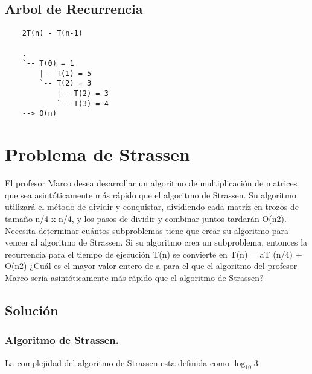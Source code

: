 \documentclass[12pt]{exam}
\begin{document}
\subsection*{Arbol de Recurrencia}
\begin{verbatim}
    2T(n) - T(n-1)

    .
    `-- T(0) = 1
        |-- T(1) = 5
        `-- T(2) = 3
            |-- T(2) = 3 
            `-- T(3) = 4
    --> O(n)
\end{verbatim}

\section*{Problema de Strassen}

El profesor Marco desea desarrollar un algoritmo de multiplicación de matrices
que sea asintóticamente más rápido que el algoritmo de Strassen. Su algoritmo utilizará el
método de dividir y conquistar, dividiendo cada matriz en trozos de tamaño n/4 x n/4, y los
pasos de dividir y combinar juntos tardarán O(n2). Necesita determinar cuántos subproblemas
tiene que crear su algoritmo para vencer al algoritmo de Strassen. Si su algoritmo crea
un subproblema, entonces la recurrencia para el tiempo de ejecución T(n) se convierte en
T(n) = aT (n/4) + O(n2) ¿Cuál es el mayor valor entero de a para el que el algoritmo del
profesor Marco sería asintóticamente más rápido que el algoritmo de Strassen?

\subsection*{Solución}
\subsubsection*{Algoritmo de Strassen.}
La complejidad del algoritmo de Strassen esta definida como $ \log _{10} 3 $ \cite[CENK2017484]{keylist}
\end{document}
